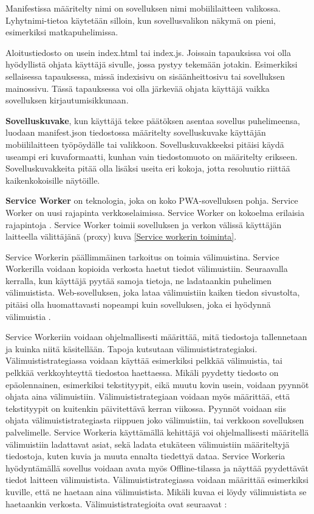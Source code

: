 \documentclass{tktltiki}
\begin{document}
Manifestissa määritelty nimi on sovelluksen nimi mobiililaitteen valikossa. Lyhytnimi-tietoa käytetään silloin, kun sovellusvalikon näkymä on pieni, esimerkiksi matkapuhelimissa.

Aloitustiedosto on usein index.html tai index.js. Joissain tapauksissa voi olla hyödyllistä ohjata käyttäjä sivulle, jossa pystyy tekemään jotakin. Esimerkiksi sellaisessa tapauksessa, missä indexisivu on sisäänheittosivu tai sovelluksen mainossivu. Tässä tapauksessa voi olla järkevää ohjata käyttäjä vaikka sovelluksen kirjautumisikkunaan.

\textbf{Sovelluskuvake}, kun käyttäjä tekee päätöksen asentaa sovellus puhelimeensa, luodaan manifest.json tiedostossa määritelty sovelluskuvake käyttäjän mobiililaitteen työpöydälle tai valikkoon. Sovelluskuvakkeeksi pitäisi käydä useampi eri kuvaformaatti, kunhan vain tiedostomuoto on määritelty erikseen. Sovelluskuvakkeita pitää olla lisäksi useita eri kokoja, jotta resoluutio riittää kaikenkokoisille näytöille.

\textbf{Service Worker} on teknologia, joka on koko PWA-sovelluksen pohja. Service Worker on uusi rajapinta verkkoselaimissa. Service Worker on kokoelma erilaisia rajapintoja \cite{malavolta2017assessing}. Service Worker toimii sovelluksen ja verkon välissä käyttäjän laitteella välittäjänä (proxy) kuva \ref{Service workerin toiminta}.

Service Workerin päällimmäinen tarkoitus on toimia välimuistina. Service Workerilla voidaan kopioida verkosta haetut tiedot välimuistiin. Seuraavalla kerralla, kun käyttäjä pyytää samoja tietoja, ne ladataankin puhelimen välimuistista. Web-sovelluksen, joka lataa välimuistiin kaiken tiedon sivustolta, pitäisi olla huomattavasti nopeampi kuin sovelluksen, joka ei hyödynnä välimuistia \cite{Walton}.

Service Workeriin voidaan ohjelmallisesti määrittää, mitä tiedostoja tallennetaan ja kuinka niitä käsitellään. Tapoja kutsutaan välimuististrategiaksi. Välimuististrategiassa voidaan käyttää esimerkiksi pelkkää välimuistia, tai pelkkää verkkoyhteyttä tiedostoa haettaessa. Mikäli pyydetty tiedosto on epäolennainen, esimerkiksi tekstityypit, eikä muutu kovin usein, voidaan pyynnöt ohjata aina välimuistiin. Välimuististrategiaan voidaan myös määrittää, että tekstityypit on kuitenkin päivitettävä kerran viikossa. Pyynnöt voidaan siis ohjata välimuististrategiasta riippuen joko välimuistiin, tai verkkoon sovelluksen palvelimelle. Service Workeria käyttämällä kehittäjä voi ohjelmallisesti määritellä välimuistiin ladattavat asiat, sekä ladata etukäteen välimuistiin määriteltyjä tiedostoja, kuten kuvia ja muuta ennalta tiedettyä dataa. Service Workeria hyödyntämällä sovellus voidaan avata myös Offline-tilassa ja näyttää pyydettävät tiedot laitteen välimuistista. Välimuististrategiassa voidaan määrittää esimerkiksi kuville, että ne haetaan aina välimuistista. Mikäli kuvaa ei löydy välimuistista se haetaankin verkosta. Välimuististrategioita ovat seuraavat \cite{Google5}:
\end{document}
